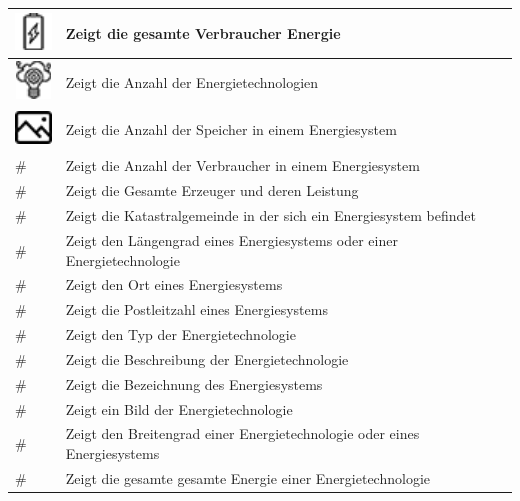 \begin{table}[]
	\begin{tabular}{|l|l|}
		\hline
		\includegraphics[height=1cm,width=1cm]{images/Icons/AzSpeicherES} & Zeigt die gesamte Verbraucher Energie                    \\ \hline
		\includegraphics[height=1cm,width=1cm]{images/Icons/AzETES} & Zeigt die Anzahl der Energietechnologien                 \\ \hline
		\includegraphics[height=1cm,width=1cm]{images/Icons/BildET}& Zeigt die Anzahl der Speicher in einem Energiesystem     \\ \hline
		\# & Zeigt die Anzahl der Verbraucher in einem Energiesystem  \\ \hline
		\# & Zeigt die  Gesamte Erzeuger und deren Leistung           \\ \hline
		\# & Zeigt die Katastralgemeinde in der sich ein Energiesystem befindet                     \\ \hline
		\# & Zeigt den Längengrad eines Energiesystems oder einer Energietechnologie                \\ \hline
		\# & Zeigt den Ort eines Energiesystems                       \\ \hline
		\# & Zeigt die Postleitzahl eines Energiesystems              \\ \hline
		\# & Zeigt den Typ der Energietechnologie                     \\ \hline
		\# & Zeigt die Beschreibung der Energietechnologie            \\ \hline
		\# & Zeigt die Bezeichnung des Energiesystems                 \\ \hline
		\# & Zeigt ein Bild der Energietechnologie                    \\ \hline
		\# & Zeigt den Breitengrad einer Energietechnologie oder eines Energiesystems               \\ \hline
		\# & Zeigt die gesamte  gesamte Energie einer Energietechnologie                            \\ \hline

\end{tabular}
\end{table}
